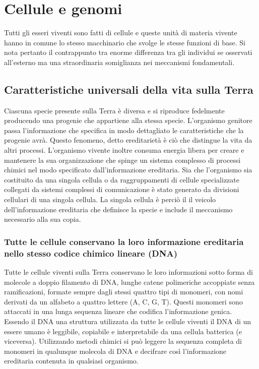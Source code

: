 \chapter{Cellule e genomi}
Tutti gli esseri viventi sono fatti di cellule e queste unit\`a di materia vivente hanno in comune lo stesso macchinario che svolge le stesse funzioni di 
base. Si nota pertanto il contrappunto tra enorme differenza tra gli individui se osservati all'esterno ma una straordinaria somiglianza nei meccanismi 
fondamentali. 
\section{Caratteristiche universali della vita sulla Terra}
Ciascuna specie presente sulla Terra \`e diversa e si riproduce fedelmente producendo una progenie che appartiene alla stessa specie. L'organismo genitore 
passa l'informazione che specifica in modo dettagliato le caratteristiche che la progenie avr\`a. Questo fenomeno, detto ereditariet\`a \`e ci\`o che 
distingue la vita da altri processi. L'organismo vivente inoltre consuma energia libera per creare e mantenere la sua organizzazione che spinge un sistema 
complesso di processi chimici nel modo specificato dall'informazione ereditaria. Sia che l'organismo sia costituito da una singola cellula o da 
raggruppamenti di cellule specializzate collegati da sistemi complessi di comunicazione \`e stato generato da divisioni cellulari di una singola cellula.
La singola cellula \`e perci\`o il il veicolo dell'informazione ereditaria che definisce la specie e include il meccanismo necessario alla sua copia. 
\subsection{Tutte le cellule conservano la loro informazione ereditaria nello stesso codice chimico lineare (DNA)}
Tutte le cellule viventi sulla Terra conservano le loro informazioni sotto forma di molecole a doppio filamento di DNA, lunghe catene polimeriche accoppiate
senza ramificazioni, formate sempre dagli stessi quattro tipi di monomeri, con nomi derivati da un alfabeto a quattro lettere (A, C, G, T). Questi monomeri
sono attaccati in una lunga sequenza lineare che codifica l'informazione genica. Essendo il DNA una struttura utilizzata da tutte le cellule viventi il DNA
di un essere umano \`e leggibile, copiabile e interpretabile da una cellula batterica (e viceversa). Utilizzando metodi chimici si pu\`o leggere la sequenza
completa di monomeri in qualunque molecola di DNA e decifrare cos\`i l'informazione ereditaria contenuta in qualsiasi organismo. 

